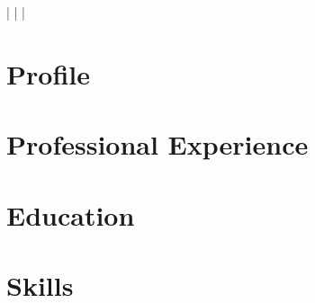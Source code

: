 \documentclass[a4paper,11pt]{article}
\begin{document}
    \begin{center}
        \myName
        \myAddress
        \myWebsite | \myMailAddress | \myGithub | \myPhoneNumber 
    \end{center}

    \section{Profile}
    \profile

    \section{Professional Experience}
        \begin{itemize}
            \professor
                \cvItemizeBegin
                    \professorA
                    \professorB
                \cvItemizeEnd
            \postdoc
                \cvItemizeBegin
                    \postdocA
                    \postdocB
                \cvItemizeEnd
            \expFlowers
                \cvItemizeBegin
                    \expFlowersA
                    \expFlowersB
                \cvItemizeEnd
            \expInfineon
                \cvItemizeBegin
                    \expInfineonA
                    \expInfineonB
                \cvItemizeEnd
            \expBmw
                \cvItemizeBegin
                    \expBmwA
                    \expBmwB
                \cvItemizeEnd
            \expEgnition
                \expEgnitionDriverless
                \expEgnitionBusinessPlan    
                \expEgnitionTeamLeader
                \expEgnitionAerodynamics
            \expSlive
            \cvItemizeBegin
                \expSliveA
                \expSliveB
            \cvItemizeEnd
        \end{itemize}

    \section{Education}
        \begin{itemize}
            \summerSchool
            \phd
            \msc
            \erasmus
            \bsc
        \end{itemize}

    \section{Skills}
        \begin{itemize}
            \skillsProgramming
            \skillsLanguages
            \skillsInterests
        \end{itemize}
\end{document}
